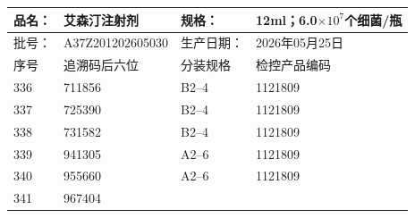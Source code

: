 \documentclass[UTF8,10pt,a4paper,fontset=fandol]{ctexart}
\newcommand{\fieldvalue}[1]{#1}
\begin{document}
\begin{center}
\begin{tabular}{|l|l|l|l|}
\hline
品名：&
\fieldvalue{艾森汀注射剂}&
规格：&
\fieldvalue{12ml；6.0$\times 10^{7}$个细菌/瓶}\\
\hline
批号：&
\fieldvalue{A37Z201202605030}&
生产日期：&
\fieldvalue{2026年05月25日}\\
\hline
序号&追溯码后六位&分装规格&检控产品编码\\
\hline
\fieldvalue{336}&
\fieldvalue{711856}&
\fieldvalue{B2--4}&
\fieldvalue{1121809}\\
\hline
\fieldvalue{337}&
\fieldvalue{725390}&
\fieldvalue{B2--4}&
\fieldvalue{1121809}\\
\hline
\fieldvalue{338}&
\fieldvalue{731582}&
\fieldvalue{B2--4}&
\fieldvalue{1121809}\\
\hline
\fieldvalue{339}&
\fieldvalue{941305}&
\fieldvalue{A2--6}&
\fieldvalue{1121809}\\
\hline
\fieldvalue{340}&
\fieldvalue{955660}&
\fieldvalue{A2--6}&
\fieldvalue{1121809}\\
\hline
\fieldvalue{341}&
\fieldvalue{967404}&

\end{tabular}
\end{center}
\end{document}
